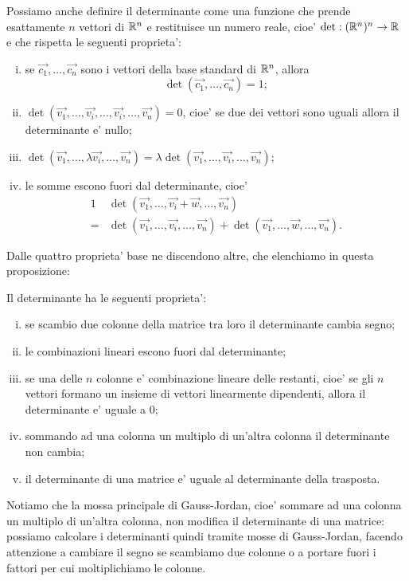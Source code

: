 Possiamo anche definire il determinante come una funzione che prende esattamente $n$ vettori di $\mathbb{R}^n$ e restituisce un numero reale, cioe' $\det : (\mathbb{R}^n)^n \to \mathbb{R}$ e che rispetta le seguenti proprieta':
\begin{enumerate}
    [(i)]
    \item se $\vec{c_1}, \dots, \vec{c_n}$ sono i vettori della base standard di $\mathbb{R}^n$, allora \[\det(\vec{c_1}, \dots, \vec{c_n}) = 1;\]
    \item $\det(\vec{v_1}, \dots, \vec{v_i}, \dots, \vec{v_i}, \dots, \vec{v_n}) = 0$, cioe' se due dei vettori sono uguali allora il determinante e' nullo;
    \item $\det(\vec{v_1}, \dots, \lambda\vec{v_i}, \dots, \vec{v_n}) = \lambda \det (\vec{v_1}, \dots, \vec{v_i}, \dots, \vec{v_n})$;
    \item le somme escono fuori dal determinante, cioe' \begin{alignat*}{1}
        &\det(\vec{v_1}, \dots, \vec{v_i} + \vec{w}, \dots, \vec{v_n})\\
        = &\det (\vec{v_1}, \dots, \vec{v_i}, \dots, \vec{v_n}) + \det (\vec{v_1}, \dots, \vec{w}, \dots, \vec{v_n}).
    \end{alignat*}
\end{enumerate}

Dalle quattro proprieta' base ne discendono altre, che elenchiamo in questa proposizione:
\begin{proposition}
    Il determinante ha le seguenti proprieta':
    \begin{enumerate}
        [(i)]
        \item se scambio due colonne della matrice tra loro il determinante cambia segno;
        \item le combinazioni lineari escono fuori dal determinante;
        \item se una delle $n$ colonne e' combinazione lineare delle restanti, cioe' se gli $n$ vettori formano un insieme di vettori linearmente dipendenti, allora il determinante e' uguale a $0$;
        \item sommando ad una colonna un multiplo di un'altra colonna il determinante non cambia;
        \item il determinante di una matrice e' uguale al determinante della trasposta.
    \end{enumerate}
\end{proposition}

Notiamo che la mossa principale di Gauss-Jordan, cioe' sommare ad una colonna un multiplo di un'altra colonna, non modifica il determinante di una matrice: possiamo calcolare i determinanti quindi tramite mosse di Gauss-Jordan, facendo attenzione a cambiare il segno se scambiamo due colonne o a portare fuori i fattori per cui moltiplichiamo le colonne.

